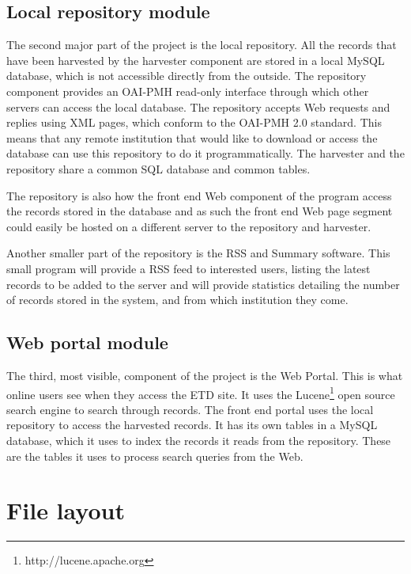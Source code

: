 \documentclass[a4paper,11pt]{article}
\begin{document}
\subsection{Local repository module}

The second major part of the project is the local repository. All the records that have been harvested by the harvester component are stored in a local MySQL database, which is not accessible directly from the outside. The repository component provides an OAI-PMH read-only interface through which other servers can access the local database. The repository accepts Web requests and replies using XML pages, which conform to the OAI-PMH 2.0 standard. This means that any remote institution that would like to download or access the database can use this repository to do it programmatically. The harvester and the repository share a common SQL database and common tables.

The repository is also how the front end Web component of the program access the records stored in the database and as such the front end Web page segment could easily be hosted on a different server to the repository and harvester.

Another smaller part of the repository is the RSS and Summary software. This small program will provide a RSS feed to interested users, listing the latest records to be added to the server and will provide statistics detailing the number of records stored in the system, and from which institution they come.

\subsection{Web portal module}

The third, most visible, component of the project is the Web Portal. This is what online users see when they access the ETD site. It uses the Lucene\footnote{http://lucene.apache.org} open source search engine to search through records. The front end portal uses the local repository to access the harvested records. It has its own tables in a MySQL database, which it uses to index the records it reads from the repository. These are the tables it uses to process search queries from the Web.

\section{File layout}
\end{document}
